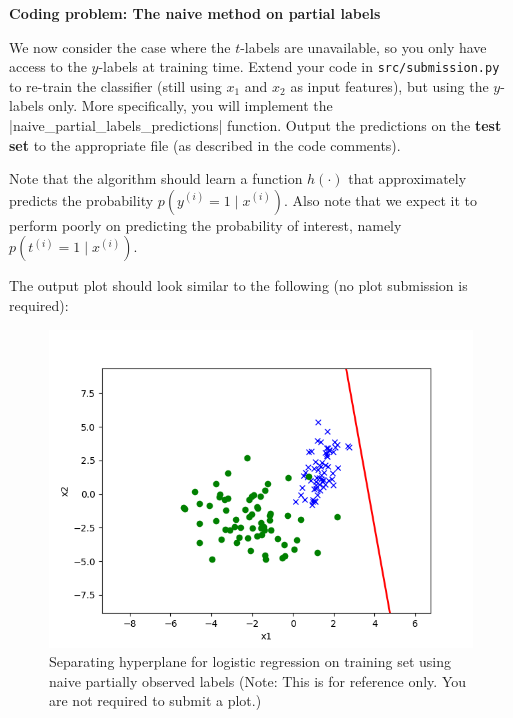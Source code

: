 \item {} \textbf{Coding problem: The naive method on partial labels}

We now consider the case where the $t$-labels are unavailable, so you only have
access to the $y$-labels at training time. Extend your code in
\texttt{src/submission.py} to re-train the classifier (still using $x_1$ and
$x_2$ as input features), but using the $y$-labels only. More specifically, you will implement
the |naive_partial_labels_predictions| function. Output the predictions
on the \textbf{test set} to the appropriate file (as described in the code comments).

Note that the algorithm should learn a function $h(\cdot)$ that approximately predicts the probability $p(y^{(i)}=1\mid x^{(i)})$. Also note that we expect it to perform poorly on predicting the probability of interest, namely $p(t^{(i)}=1\mid x^{(i)})$.

The output plot should look similar to the following (no plot submission is required):
\begin{figure}[H]
	\centering
	\vspace{2mm}
	\includegraphics[width=0.5\linewidth]{02-posonly/posonly_naive_pred.png}
    \caption{Separating hyperplane for logistic regression on training set using naive partially observed labels (Note: This is for reference only.  You are not required to submit a plot.)}
\end{figure}

